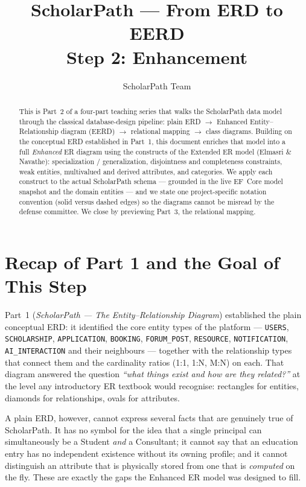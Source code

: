 \documentclass[11pt,a4paper]{article}
\title{ScholarPath --- From ERD to EERD\\[0.3em]\large Step 2: Enhancement}
\author{ScholarPath Team}
\date{}
\begin{document}
\maketitle

\begin{abstract}
This is Part~2 of a four-part teaching series that walks the ScholarPath data
model through the classical database-design pipeline: plain ERD $\rightarrow$
Enhanced Entity--Relationship diagram (EERD) $\rightarrow$ relational mapping
$\rightarrow$ class diagrams. Building on the conceptual ERD established in
Part~1, this document enriches that model into a full \emph{Enhanced} ER diagram
using the constructs of the Extended ER model (Elmasri \& Navathe):
specialization / generalization, disjointness and completeness constraints, weak
entities, multivalued and derived attributes, and categories. We apply each
construct to the actual ScholarPath schema --- grounded in the live EF~Core model
snapshot and the domain entities --- and we state one project-specific notation
convention (solid versus dashed edges) so the diagrams cannot be misread by the
defense committee. We close by previewing Part~3, the relational mapping.
\end{abstract}

\tableofcontents

\bigskip

\section{Recap of Part 1 and the Goal of This Step}

Part~1 (\emph{ScholarPath --- The Entity--Relationship Diagram}) established the
plain conceptual ERD: it identified the core entity types of the platform ---
\texttt{USERS}, \texttt{SCHOLARSHIP}, \texttt{APPLICATION}, \texttt{BOOKING},
\texttt{FORUM\_POST}, \texttt{RESOURCE},
\texttt{NOTIFICATION}, \texttt{AI\_INTERACTION} and their neighbours --- together
with the relationship types that connect them and the cardinality ratios
(1:1, 1:N, M:N) on each. That diagram answered the question \emph{``what things
exist and how are they related?''} at the level any introductory ER textbook
would recognise: rectangles for entities, diamonds for relationships, ovals for
attributes.

A plain ERD, however, cannot express several facts that are genuinely true of
ScholarPath. It has no symbol for the idea that a single principal can
simultaneously be a Student \emph{and} a Consultant; it cannot say that an
education entry has no independent existence without its owning profile; and it
cannot distinguish an attribute that is physically stored from one that is
\emph{computed} on the fly. These are exactly the gaps the Enhanced ER model
was designed to fill.
\end{document}
